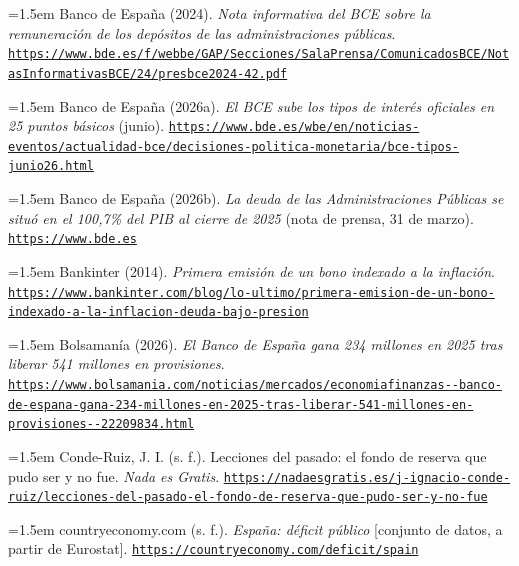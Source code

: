 \documentclass[10pt,a4paper]{article}
\begin{document}
\noindent\hangindent=1.5em Banco de España (2024). \textit{Nota informativa del BCE sobre la remuneración de los depósitos de las administraciones públicas}. \href{https://www.bde.es/f/webbe/GAP/Secciones/SalaPrensa/ComunicadosBCE/NotasInformativasBCE/24/presbce2024-42.pdf}{\nolinkurl{https://www.bde.es/f/webbe/GAP/Secciones/SalaPrensa/ComunicadosBCE/NotasInformativasBCE/24/presbce2024-42.pdf}}

\noindent\hangindent=1.5em Banco de España (2026a). \textit{El BCE sube los tipos de interés oficiales en 25 puntos básicos} (junio). \href{https://www.bde.es/wbe/en/noticias-eventos/actualidad-bce/decisiones-politica-monetaria/bce-tipos-junio26.html}{\nolinkurl{https://www.bde.es/wbe/en/noticias-eventos/actualidad-bce/decisiones-politica-monetaria/bce-tipos-junio26.html}}

\noindent\hangindent=1.5em Banco de España (2026b). \textit{La deuda de las Administraciones Públicas se situó en el 100,7\% del PIB al cierre de 2025} (nota de prensa, 31 de marzo). \href{https://www.bde.es}{\nolinkurl{https://www.bde.es}}

\noindent\hangindent=1.5em Bankinter (2014). \textit{Primera emisión de un bono indexado a la inflación}. \href{https://www.bankinter.com/blog/lo-ultimo/primera-emision-de-un-bono-indexado-a-la-inflacion-deuda-bajo-presion}{\nolinkurl{https://www.bankinter.com/blog/lo-ultimo/primera-emision-de-un-bono-indexado-a-la-inflacion-deuda-bajo-presion}}

\noindent\hangindent=1.5em Bolsamanía (2026). \textit{El Banco de España gana 234 millones en 2025 tras liberar 541 millones en provisiones}. \href{https://www.bolsamania.com/noticias/mercados/economiafinanzas--banco-de-espana-gana-234-millones-en-2025-tras-liberar-541-millones-en-provisiones--22209834.html}{\nolinkurl{https://www.bolsamania.com/noticias/mercados/economiafinanzas--banco-de-espana-gana-234-millones-en-2025-tras-liberar-541-millones-en-provisiones--22209834.html}}

\noindent\hangindent=1.5em Conde-Ruiz, J. I. (s. f.). Lecciones del pasado: el fondo de reserva que pudo ser y no fue. \textit{Nada es Gratis}. \href{https://nadaesgratis.es/j-ignacio-conde-ruiz/lecciones-del-pasado-el-fondo-de-reserva-que-pudo-ser-y-no-fue}{\nolinkurl{https://nadaesgratis.es/j-ignacio-conde-ruiz/lecciones-del-pasado-el-fondo-de-reserva-que-pudo-ser-y-no-fue}}

\noindent\hangindent=1.5em countryeconomy.com (s. f.). \textit{España: déficit público} [conjunto de datos, a partir de Eurostat]. \href{https://countryeconomy.com/deficit/spain}{\nolinkurl{https://countryeconomy.com/deficit/spain}}
\end{document}
